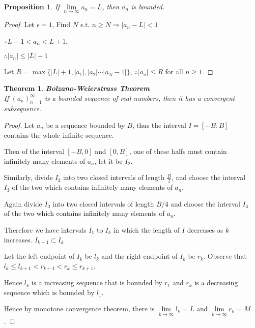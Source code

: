 \documentclass[12pt]{article}
\newcommand{\abs}[1]{\left| #1 \right|}
\theoremstyle{plain}
\newtheorem{theorem}{Theorem}[subsection]
\newtheorem{proposition}{Proposition}[subsection]
\newcommand{\dlim}{\displaystyle\lim\limits}
\begin{document}
    \begin{proposition}
        If $\dlim_{n\to\infty} a_n=L$, then $a_n$ is bounded. 
    \end{proposition}
    \begin{proof}
        Let $\epsilon = 1$, Find $N$ s.t. $n\geq N \Rightarrow \abs{a_n-L}<1$
        
        $\therefore L-1<a_n<L+1$,

        $\therefore \abs{a_n}\leq \abs L+1$

        Let $R =\max\{\abs{L}+1, \abs{a_1}, \abs{a_2}\cdots \abs{a_N-1}\}$,
        $\therefore \abs{a_n}\leq R$ for all $n\geq 1$.
    \end{proof}

    {\color{Blue}
    \begin{theorem}\textbf{Bolzano-Weierstrass Theorem}\\
        If $(a_n)_{n=1}^\infty$ is a bounded sequence of real numbers,
        then it has a convergent subsequence. 
    \end{theorem}
    \begin{proof}
        Let $a_n$ be a sequence bounded by $B$, thus the interval
        $I=[-B, B]$ contains the whole infinite sequence. 

        Then of the interval $[-B, 0]$ and $[0, B]$, one of these halfs must 
        contain infinitely many elements of $a_n$, let it be $I_2$.

        Similarly, divide $I_2$ into two closed intervals of length $\frac{B}2$,
        and choose the interval $I_3$ of the two which contains 
        infinitely many elements of $a_n$. 

        Again divide $I_3$ into two closed intervals of length $B/4$ 
        and choose the interval $I_4$ of the two which contains 
        infinitely many elements of $a_n$.

        Therefore we have intervals $I_1$ to $I_k$ in which the 
        length of $I$ decreases as $k$ increases. $I_{k-1} \subset I_k$
        
        Let the left endpoint of $I_k$ be $l_k$ 
        and the right endpoint of $I_k$ be $r_k$.
        Observe that  $l_k\leq l_{k+1}<r_{k+1}<r_k\leq r_{k+1}$.

        Hence $l_k$ is a increasing sequence that is bounded by 
        $r_1$ and $r_k$ is a decreasing sequence which is bounded by $l_1$.

        Hence by monotone convergence theorem, 
        there is $\dlim_{k\to\infty} l_k = L$ and $\dlim_{k\to \infty} r_k = M$.
        

\end{proof}}
\end{document}
